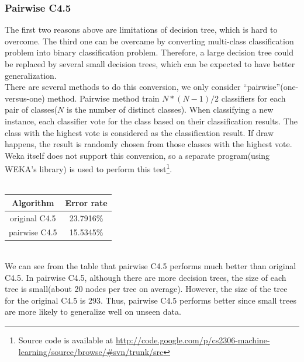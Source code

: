 \documentclass[a4paper,11pt]{article}
\begin{document}
\subsubsection{Pairwise C4.5}
The first two reasons above are limitations of decision tree, which is hard to overcome. The third one can be overcame by converting multi-class classification problem into binary classification problem. Therefore, a large decision tree could be replaced by several small decision trees, which can be expected to have better generalization.\\
There are several methods to do this conversion, we only consider ``pairwise''(one-versus-one) method. Pairwise method train $N*(N-1)/2$ classifiers for each pair of classes($N$ is the number of distinct classes). When classifying a new instance, each classifier vote for the class based on their classification results. The class with the highest vote is considered as the classification result. If draw happens, the result is randomly chosen from those classes with the highest vote. Weka itself does not support this conversion, so a separate program(using WEKA's library) is used to perform this test\footnote{Source code is available at \url{http://code.google.com/p/cs2306-machine-learning/source/browse/#svn/trunk/src}}.\\
\vspace{0.5cm}\\
\begin{tabular}{c c}
Algorithm	& Error rate\\
\hline \hline
original C4.5	& 23.7916\%\\
pairwise C4.5	& 15.5345\%\\
\end{tabular}
\vspace{0.5cm}\\
We can see from the table that pairwise C4.5 performs much better than original C4.5. In pairwise C4.5, although there are more decision trees, the size of each tree is small(about 20 nodes per tree on average). However, the size of the tree for the original C4.5 is 293. Thus, pairwise C4.5 performs better since small trees are more likely to generalize well on unseen data.
\end{document}
